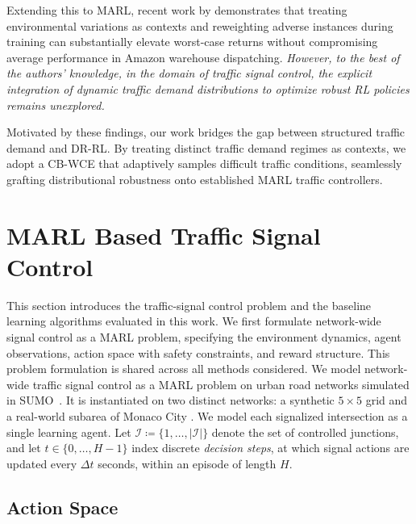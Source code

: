 \documentclass[lettersize,journal]{IEEEtran}
\begin{document}
Extending this to MARL, recent work by \cite{liu2025distributionallyrobustmultiagentreinforcement} demonstrates that treating environmental variations as contexts and reweighting adverse instances during training can substantially elevate worst-case returns without compromising average performance in Amazon warehouse dispatching. \emph{However, to the best of the authors' knowledge, in the domain of traffic signal control, the explicit integration of dynamic traffic demand distributions to optimize robust RL policies remains unexplored.}

Motivated by these findings, our work bridges the gap between structured traffic demand and DR-RL. By treating distinct traffic demand regimes as contexts, we adopt a CB-WCE that adaptively samples difficult traffic conditions, seamlessly grafting distributional robustness onto established MARL traffic controllers.

\section{MARL Based Traffic Signal Control}
\label{sec:problem_statement}

This section introduces the traffic-signal control problem and the baseline learning algorithms evaluated in this work. We first formulate network-wide signal control as a MARL problem, specifying the environment dynamics, agent observations, action space with safety constraints, and reward structure. This problem formulation is shared across all methods considered. We model network-wide traffic signal control as a MARL problem on urban road networks simulated in \textsc{SUMO}~\cite{Krajzewicz2012SUMO}. It is instantiated on two distinct networks: a synthetic $5\times5$ grid and a real-world  subarea of Monaco City \cite{codeca2018monaco}. We model each signalized intersection as a single learning agent. Let $\mathcal{I} \coloneqq \{1,\dots,|\mathcal{I}|\}$ denote the set of controlled junctions, and let $t \in \{0,\dots,H-1\}$ index discrete \emph{decision steps}, at which signal actions are updated every $\Delta t$ seconds, within an episode of length $H$. 

\subsection{Action Space}
\label{subsubsec:actionspace_controller}
\end{document}
